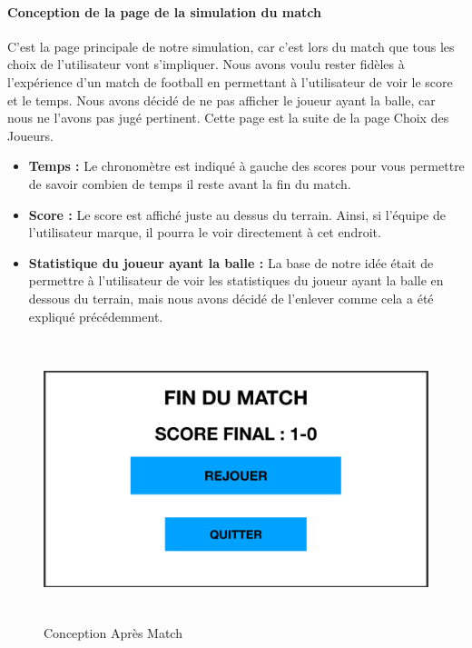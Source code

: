     \vspace{15pt}
\paragraph{Conception de la page de la simulation du match}
    C'est la page principale de notre simulation, car c'est lors du match que tous les choix de l'utilisateur vont s'impliquer. Nous avons voulu rester fidèles à l'expérience d'un match de football en permettant à l'utilisateur de voir le score et le temps. Nous avons décidé de ne pas afficher le joueur ayant la balle, car nous ne l'avons pas jugé pertinent. Cette page est la suite de la page Choix des Joueurs.

\vspace{15pt}

\begin{itemize}
    \item \textbf{Temps :} 
        Le chronomètre est indiqué à gauche des scores pour vous permettre de savoir combien de temps il reste avant la fin du match.

    \vspace{15pt}

    \item \textbf{Score :} 
         Le score est affiché juste au dessus du terrain. Ainsi, si l'équipe de l'utilisateur marque, il pourra le voir directement à cet endroit.

    \vspace{15pt}
            
    \item \textbf{Statistique du joueur ayant la balle :}
        La base de notre idée était de permettre à l'utilisateur de voir les statistiques du joueur ayant la balle en dessous du terrain, mais nous avons décidé de l'enlever comme cela a été expliqué précédemment.
    
    \vspace{15pt}
\end{itemize}

\newpage

\begin{figure}[h]
\centering
\includegraphics[width=12.82cm, height=8.2cm]{images/ConceptIHM6.png}
\caption{Conception Après Match}
\label{fig:stats}
\end{figure}

